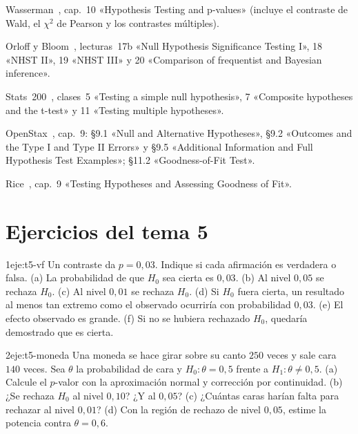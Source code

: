 \begin{lecturas}
\item Wasserman~\cite{wasserman}, cap.~10 «Hypothesis Testing and p-values» (incluye el contraste de Wald, el $\chi^{2}$ de Pearson y los contrastes múltiples).
\item Orloff y Bloom~\cite{mit1805}, lecturas~17b «Null Hypothesis Significance Testing I», 18 «NHST II», 19 «NHST III» y 20 «Comparison of frequentist and Bayesian inference».
\item Stats~200~\cite{stats200}, clases~5 «Testing a simple null hypothesis», 7 «Composite hypotheses and the t-test» y 11 «Testing multiple hypotheses».
\item OpenStax~\cite{openstax}, cap.~9: §9.1 «Null and Alternative Hypotheses», §9.2 «Outcomes and the Type I and Type II Errors» y §9.5 «Additional Information and Full Hypothesis Test Examples»; §11.2 «Goodness-of-Fit Test».
\item Rice~\cite{rice}, cap.~9 «Testing Hypotheses and Assessing Goodness of Fit».
\end{lecturas}

\section*{Ejercicios del tema 5}

\begin{ejercicio}{1}{eje:t5-vf}
Un contraste da $p=0{,}03$. Indique si cada afirmación es verdadera o falsa. (a) La probabilidad de que $H_0$ sea cierta es $0{,}03$. (b) Al nivel $0{,}05$ se rechaza $H_0$. (c) Al nivel $0{,}01$ se rechaza $H_0$. (d) Si $H_0$ fuera cierta, un resultado al menos tan extremo como el observado ocurriría con probabilidad $0{,}03$. (e) El efecto observado es grande. (f) Si no se hubiera rechazado $H_0$, quedaría demostrado que es cierta.
\end{ejercicio}

\begin{ejercicio}{2}{eje:t5-moneda}
Una moneda se hace girar sobre su canto $250$ veces y sale cara $140$ veces. Sea $\theta$ la probabilidad de cara y $H_0:\theta=0{,}5$ frente a $H_1:\theta\neq0{,}5$. (a) Calcule el $p$-valor con la aproximación normal y corrección por continuidad. (b) ¿Se rechaza $H_0$ al nivel $0{,}10$? ¿Y al $0{,}05$? (c) ¿Cuántas caras harían falta para rechazar al nivel $0{,}01$? (d) Con la región de rechazo de nivel $0{,}05$, estime la potencia contra $\theta=0{,}6$.
\end{ejercicio}

